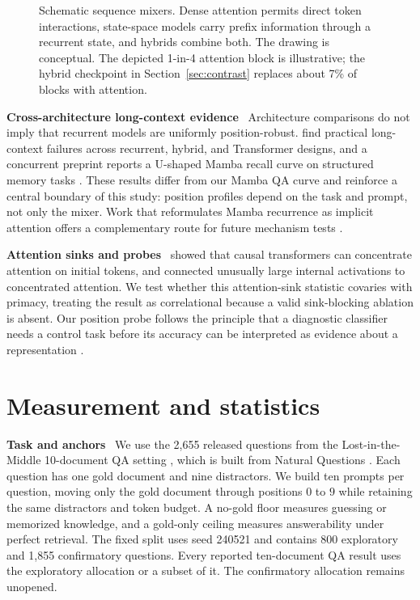 \documentclass{article}
\newcommand{\runin}[1]{\par\medskip\noindent\textbf{#1}\ }
\begin{document}
\begin{figure}[t]
\caption{Schematic sequence mixers. Dense attention permits direct token interactions, state-space models carry prefix information through a recurrent state, and hybrids combine both. The drawing is conceptual. The depicted 1-in-4 attention block is illustrative; the hybrid checkpoint in Section~\ref{sec:contrast} replaces about 7\% of blocks with attention.}
\label{fig:mixer-schematic}
\end{figure}

\runin{Cross-architecture long-context evidence}
Architecture comparisons do not imply that recurrent models are uniformly position-robust.
\citet{huang2025well} find practical long-context failures across recurrent, hybrid, and Transformer designs, and a concurrent preprint reports a U-shaped Mamba recall curve on structured memory tasks \citep{airlangga2025primacy}.
These results differ from our Mamba QA curve and reinforce a central boundary of this study: position profiles depend on the task and prompt, not only the mixer.
Work that reformulates Mamba recurrence as implicit attention offers a complementary route for future mechanism tests \citep{ali2025hidden}.

\runin{Attention sinks and probes}
\citet{xiao2024efficient} showed that causal transformers can concentrate attention on initial tokens, and \citet{sun2024massive} connected unusually large internal activations to concentrated attention.
We test whether this attention-sink statistic covaries with primacy, treating the result as correlational because a valid sink-blocking ablation is absent.
Our position probe follows the principle that a diagnostic classifier needs a control task before its accuracy can be interpreted as evidence about a representation \citep{hewitt2019probes}.

\section{Measurement and statistics}
\label{sec:method}

\runin{Task and anchors}
We use the 2{,}655 released questions from the Lost-in-the-Middle 10-document QA setting \citep{liu2024lost}, which is built from Natural Questions \citep{kwiatkowski2019nq}.
Each question has one gold document and nine distractors.
We build ten prompts per question, moving only the gold document through positions $0$ to $9$ while retaining the same distractors and token budget.
A no-gold floor measures guessing or memorized knowledge, and a gold-only ceiling measures answerability under perfect retrieval.
The fixed split uses seed 240521 and contains 800 exploratory and 1{,}855 confirmatory questions.
Every reported ten-document QA result uses the exploratory allocation or a subset of it.
The confirmatory allocation remains unopened.
\end{document}
